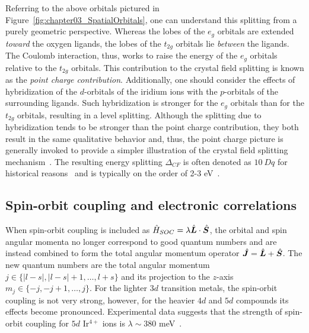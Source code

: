 Referring to the above orbitals pictured in Figure~\ref{fig:chapter03_SpatialOrbitals}, one can understand this splitting from a purely geometric perspective.
Whereas the lobes of the $e_g$ orbitals are extended \textit{toward} the oxygen ligands, the lobes of the $t_{2g}$ orbitals lie \textit{between} the ligands.
The Coulomb interaction, thus, works to raise the energy of the $e_g$ orbitals relative to the $t_{2g}$ orbitals.
This contribution to the crystal field splitting is known as the \textit{point charge contribution}.
Additionally, one should consider the effects of hybridization of the $d$-orbitals of the iridium ions with the $p$-orbitals of the surrounding ligands.
Such hybridization is stronger for the $e_g$ orbitals than for the $t_{2g}$ orbitals, resulting in a level splitting.
Although the splitting due to hybridization tends to be stronger than the point charge contribution, they both result in the same qualitative behavior and, thus, the point charge picture is generally invoked to provide a simpler illustration of the crystal field splitting mechanism~\cite{Khomskii2014}.
The resulting energy splitting $\Delta_{CF}$ is often denoted as $10~Dq$ for historical reasons~\cite{SchlappPR1932} and is typically on the order of 2-3 eV~\cite{Maekawa2004}.


%
%
\subsection{Spin-orbit coupling and electronic correlations}
%
%
When spin-orbit coupling is included as $\hat{H}_{SOC} = \lambda \hat{\bm{L}} \cdot \hat{\bm{S}}$, the orbital and spin angular momenta no longer correspond to good quantum numbers and are instead combined to form the total angular momentum operator $\hat{\bm{J}} = \hat{\bm{L}} + \hat{\bm{S}}$.
The new quantum numbers are the total angular momentum $j \in \{|l - s|, |l - s| + 1, \ldots, l + s\}$ and its projection to the $z$-axis $m_j \in \{-j, -j + 1, \ldots, j\}$.
For the lighter $3d$ transition metals, the spin-orbit coupling is not very strong, however, for the heavier $4d$ and $5d$ compounds its effects become pronounced.
Experimental data suggests that the strength of spin-orbit coupling for $5d$ Ir$^{4+}$ ions is $\lambda \sim 380$ meV~\cite{SchirmerJPC1984}.

